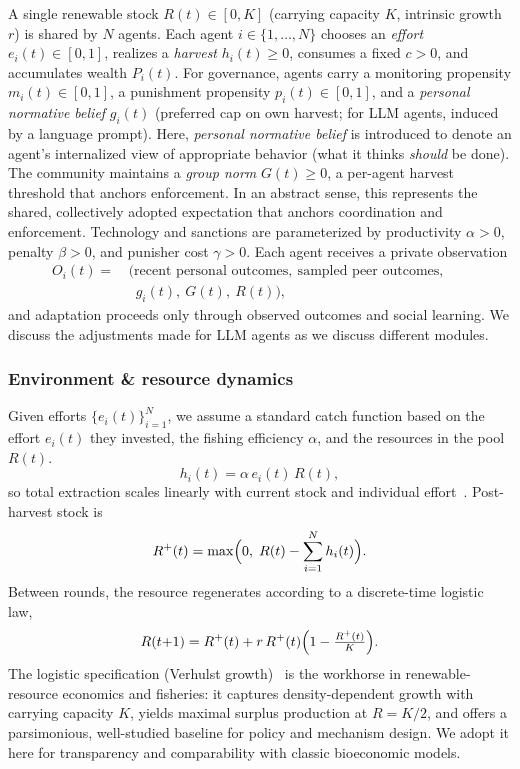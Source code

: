 \documentclass[sigconf]{aamas}
\begin{document}
A single renewable stock $R(t)\!\in\![0,K]$ (carrying capacity $K$, intrinsic growth $r$) is shared by $N$ agents. 
Each agent $i \in \{1,\dots,N\}$ chooses an \emph{effort} $e_i(t) \in [0,1]$, realizes a \emph{harvest} $h_i(t) \ge 0$, consumes a fixed $c>0$, and accumulates wealth $P_i(t)$. 
For governance, agents carry a monitoring propensity $m_i(t) \in [0,1]$, a punishment propensity $p_i(t) \in [0,1]$, and a \emph{personal normative belief} $g_i(t)$ (preferred cap on own harvest; for LLM agents, induced by a language prompt).
Here, \emph{personal normative belief} is introduced to denote an agent's internalized view of appropriate behavior (what it thinks \emph{should} be done).
The community maintains a \emph{group norm} $G(t) \ge 0$, a per-agent harvest threshold that anchors enforcement.
In an abstract sense, this represents the shared, collectively adopted expectation that anchors coordination and enforcement.
Technology and sanctions are parameterized by productivity $\alpha>0$, penalty $\beta>0$, and punisher cost $\gamma>0$. 
Each agent receives a private observation
\begin{align*}    
O_i(t)=\,&\big(\text{recent personal outcomes},\ \text{sampled peer outcomes},&&\\
         &\,\,\,g_i(t),\ G(t),\ R(t)\big),&&\nonumber
\end{align*}
and adaptation proceeds only through observed outcomes and social learning.
We discuss the adjustments made for LLM agents as we discuss different modules.

\subsubsection{\textbf{Environment \& resource dynamics}}

Given efforts $\{e_i(t)\}_{i=1}^N$, we assume a standard catch function based on the effort $e_i(t)$ they invested, the fishing efficiency $\alpha$, and the resources in the pool $R(t)$.
\[
h_i(t)=\alpha\, e_i(t)\, R(t),
\]
so total extraction scales linearly with current stock and individual effort~\cite{hilborn2013quantitative}. Post-harvest stock is
\[
R^{+}(t)=\max\Bigl(0,\;R(t)-\sum_{i=1}^N h_i(t)\Bigr).
\]
Between rounds, the resource regenerates according to a discrete-time logistic law,
\[
R(t{+}1)=R^{+}(t)+ r\,R^{+}(t)\Bigl(1-\tfrac{R^{+}(t)}{K}\Bigr).
\]
The logistic specification (Verhulst growth)~\cite{bacaer2011verhulst} is the workhorse in renewable-resource economics and fisheries: it captures density-dependent growth with carrying capacity $K$, yields maximal surplus production at $R=K/2$, and offers a parsimonious, well-studied baseline for policy and mechanism design. 
We adopt it here for transparency and comparability with classic bioeconomic models.
\end{document}
